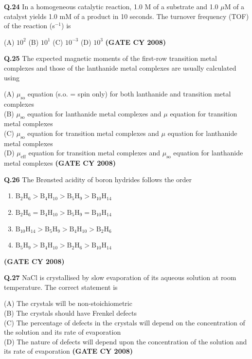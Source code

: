 \documentclass[12pt]{article}
\begin{document}
\begin{enumerate}
\vspace{0.5cm}

\textbf{Q.24} In a homogeneous catalytic reaction, 1.0 M of a substrate and 1.0 $\mu$M of a catalyst yields 1.0 mM of a product in 10 seconds. The turnover frequency (TOF) of the reaction (s$^{-1}$) is

(A) $10^2$ \hspace{1cm}
(B) $10^1$ \hspace{1cm}
(C) $10^{-3}$ \hspace{1cm}
(D) $10^3$   \textbf{(GATE CY 2008)}


\textbf{Q.25} The expected magnetic moments of the first-row transition metal complexes and those of the lanthanide metal complexes are usually calculated using

(A) $\mu_{\text{so}}$ equation (s.o. = spin only) for both lanthanide and transition metal complexes\\
(B) $\mu_{\text{so}}$ equation for lanthanide metal complexes and $\mu$ equation for transition metal complexes\\
(C) $\mu_{\text{so}}$ equation for transition metal complexes and $\mu$ equation for lanthanide metal complexes\\
(D) $\mu_{\text{eff}}$ equation for transition metal complexes and $\mu_{\text{so}}$ equation for lanthanide metal complexes   \textbf{(GATE CY 2008)}


\vspace{0.5cm}

\textbf{Q.26} \quad The Brønsted acidity of boron hydrides follows the order

\begin{enumerate}
    \item[(A)] $\mathrm{B_2H_6 > B_4H_{10} > B_5H_9 > B_{10}H_{14}}$
    \item[(B)] $\mathrm{B_2H_6 = B_4H_{10} > B_5H_9 = B_{10}H_{14}}$
    \item[(C)] $\mathrm{B_{10}H_{14} > B_5H_9 > B_4H_{10} > B_2H_6}$
    \item[(D)] $\mathrm{B_5H_9 > B_4H_{10} > B_2H_6 > B_{10}H_{14}}$
\end{enumerate} \textbf{(GATE CY 2008)}

\vspace{0.5cm}

\textbf{Q.27} NaCl is crystallised by slow evaporation of its aqueous solution at room temperature. The correct statement is

(A) The crystals will be non-stoichiometric\\
(B) The crystals should have Frenkel defects\\
(C) The percentage of defects in the crystals will depend on the concentration of the solution and its rate of evaporation\\
(D) The nature of defects will depend upon the concentration of the solution and its rate of evaporation   \textbf{(GATE CY 2008)}



\end{enumerate}
\end{document}
